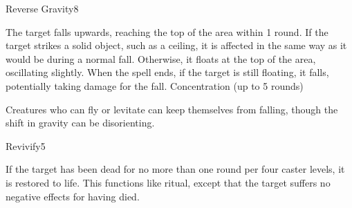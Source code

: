 \begin{spellsection}{Reverse Gravity}{8}
\begin{spellheader}
\end{spellheader}
\begin{spellcontent}
    \begin{spelltargetinginfo}
    \end{spelltargetinginfo}
    \begin{spelleffects}
        \spelleffect The target falls upwards, reaching the top of the area within 1 round. If the target strikes a solid object, such as a ceiling, it is affected in the same way as it would be during a normal fall. Otherwise, it floats at the top of the area, oscillating slightly. When the spell ends, if the target is still floating, it falls, potentially taking damage for the fall.
        \spelldur Concentration (up to 5 rounds)
    \end{spelleffects}
\end{spellcontent}
\begin{spellfooter}
    \spellnotes Creatures who can fly or levitate can keep themselves from falling, though the shift in gravity can be disorienting.
\end{spellfooter}
\end{spellsection}

\begin{spellsection}{Revivify}{5}
\begin{spellheader}
\end{spellheader}
\begin{spellcontent}
    \begin{spelltargetinginfo}
    \end{spelltargetinginfo}
    \begin{spelleffects}
        \spelleffect If the target has been dead for no more than one round per four caster levels, it is restored to life. This functions like  ritual, except that the target suffers no negative effects for having died.
        \spellline
    \end{spelleffects}
\end{spellcontent}
\begin{spellfooter}
\end{spellfooter}
\end{spellsection}

